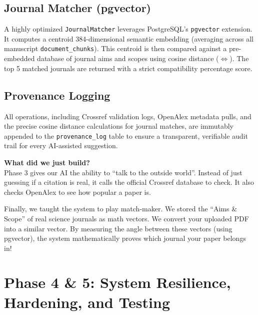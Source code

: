 \documentclass[11pt,a4paper]{article}
\begin{document}
\subsection*{Journal Matcher (pgvector)}
A highly optimized \texttt{JournalMatcher} leverages PostgreSQL's \texttt{pgvector} extension. It computes a centroid 384-dimensional semantic embedding (averaging across all manuscript \texttt{document\_chunks}). This centroid is then compared against a pre-embedded database of journal aims and scopes using cosine distance ($\Leftrightarrow$). The top 5 matched journals are returned with a strict compatibility percentage score.

\subsection*{Provenance Logging}
All operations, including Crossref validation logs, OpenAlex metadata pulls, and the precise cosine distance calculations for journal matches, are immutably appended to the \texttt{provenance\_log} table to ensure a transparent, verifiable audit trail for every AI-assisted suggestion.

\vspace{0.5cm}
\begin{tcolorbox}[colback=blue!5,colframe=blue!40!black,title=For Dummies: Phase 3]
\textbf{What did we just build?} \\
Phase 3 gives our AI the ability to ``talk to the outside world''. Instead of just guessing if a citation is real, it calls the official Crossref database to check. It also checks OpenAlex to see how popular a paper is.

Finally, we taught the system to play match-maker. We stored the ``Aims \& Scope'' of real science journals as math vectors. We convert your uploaded PDF into a similar vector. By measuring the angle between these vectors (using pgvector), the system mathematically proves which journal your paper belongs in!
\end{tcolorbox}

\section{Phase 4 \& 5: System Resilience, Hardening, and Testing}
\end{document}

